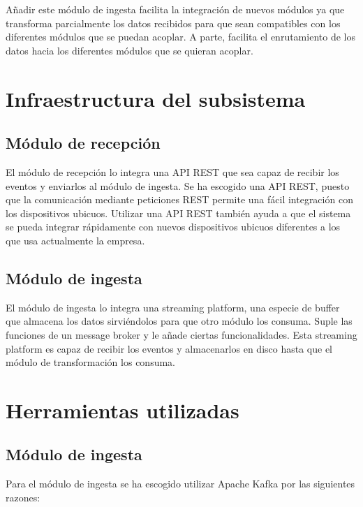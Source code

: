 Añadir este módulo de ingesta facilita la integración de nuevos módulos ya que transforma parcialmente los datos recibidos para que sean compatibles con los diferentes módulos que se puedan acoplar. A parte, facilita el enrutamiento de los datos hacia los diferentes módulos que se quieran acoplar. 



\section{Infraestructura del subsistema}

\subsection{Módulo de recepción}
El módulo de recepción lo integra una API REST que sea capaz de recibir los eventos y enviarlos al módulo de ingesta. Se ha escogido una API REST, puesto que la comunicación mediante peticiones REST permite una fácil integración con los dispositivos ubicuos. Utilizar una API REST también ayuda a que el sistema se pueda integrar rápidamente con nuevos dispositivos ubicuos diferentes a los que usa actualmente la empresa.

\subsection{Módulo de ingesta}
El módulo de ingesta lo integra una streaming platform, una especie de buffer que almacena los datos sirviéndolos para que otro módulo los consuma. Suple las funciones de un message broker\cite{Tfg:messagebroker} y le añade ciertas funcionalidades. Esta streaming platform es capaz de recibir los eventos y almacenarlos en disco hasta que el módulo de transformación los consuma.


\section{Herramientas utilizadas}

\subsection{Módulo de ingesta}
Para el módulo de ingesta se ha escogido utilizar Apache Kafka\cite{Tfg:kafka} por las siguientes razones:

